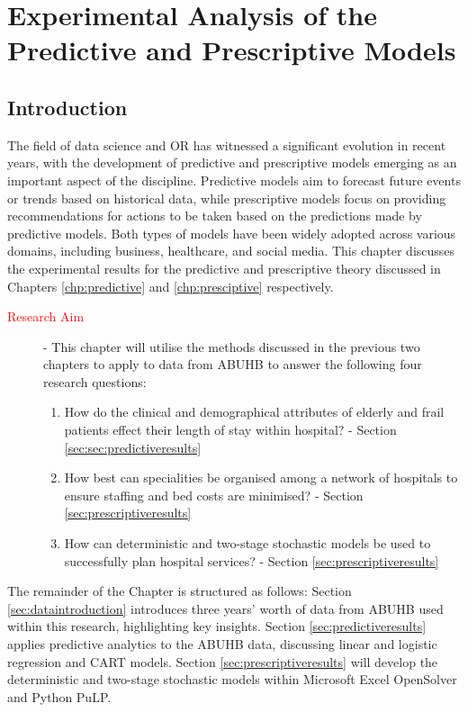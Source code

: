 \documentclass[../thesis.tex]{subfiles}
\begin{document}
\chapter{Experimental Analysis of the Predictive and Prescriptive Models}\label{chp:Experimental Analysis}
\section{Introduction}
The field of data science and OR has witnessed a significant evolution in recent years, with the development of predictive and prescriptive models emerging as an important aspect of the discipline. Predictive models aim to forecast future events or trends based on historical data, while prescriptive models focus on providing recommendations for actions to be taken based on the predictions made by predictive models. Both types of models have been widely adopted across various domains, including business, healthcare, and social media. This chapter discusses the experimental results for the predictive and prescriptive theory discussed in Chapters \ref{chp:predictive} and \ref{chp:presciptive} respectively.

\begin{description}
\item[\textcolor{red}{Research Aim}] - This chapter will utilise the methods discussed in the previous two chapters to apply to data from ABUHB to answer the following four research questions:
\begin{enumerate}
    \item How do the clinical and demographical attributes of elderly and frail patients effect their length of stay within hospital? - Section \ref{sec:sec:predictiveresults}
    \item How best can specialities be organised among a network of hospitals to ensure staffing and bed costs are minimised? - Section \ref{sec:prescriptiveresults}
    \item How can deterministic and two-stage stochastic models be used to successfully plan hospital services? - Section \ref{sec:prescriptiveresults}%
\end{enumerate}
\end{description}

The remainder of the Chapter is structured as follows: Section \ref{sec:dataintroduction} introduces three years' worth of data from ABUHB used within this research, highlighting key insights. Section \ref{sec:predictiveresults} applies predictive analytics to the ABUHB data, discussing linear and logistic regression and CART models. Section \ref{sec:prescriptiveresults} will develop the deterministic and two-stage stochastic models within Microsoft Excel OpenSolver and Python PuLP.
\end{document}
